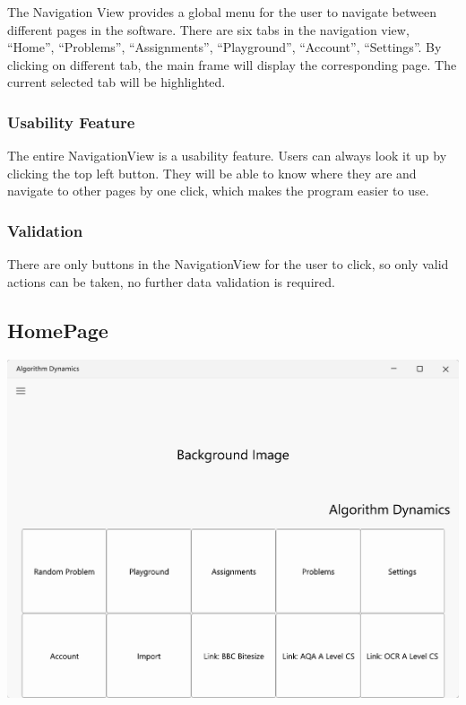 \documentclass[a4paper]{report}
\begin{document}
The Navigation View provides a global menu for the user to navigate between different pages in the software. There are six tabs in the navigation view, ``Home'', ``Problems'', ``Assignments'', ``Playground'', ``Account'', ``Settings''. By clicking on different tab, the main frame will display the corresponding page. The current selected tab will be highlighted.

\subsubsection{Usability Feature}

The entire NavigationView is a usability feature. Users can always look it up by clicking the top left button. They will be able to know where they are and navigate to other pages by one click, which makes the program easier to use.

\subsubsection{Validation}

There are only buttons in the NavigationView for the user to click, so only valid actions can be taken, no further data validation is required.

\subsection{HomePage}

\includegraphics[width=\textwidth, height=\textheight, keepaspectratio]{HomePage-design}
\end{document}
